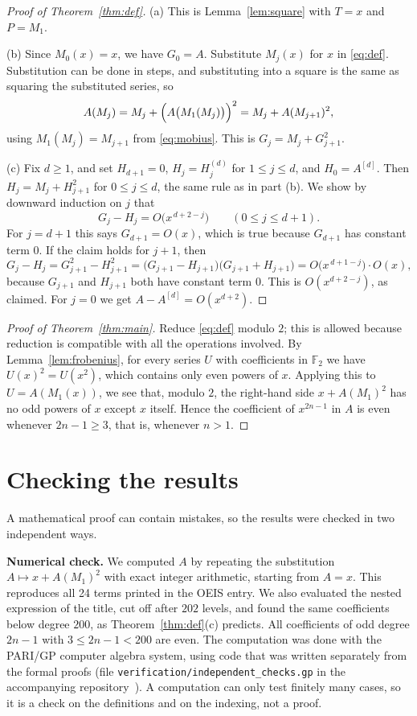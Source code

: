 \documentclass[11pt,a4paper]{article}
\theoremstyle{definition}
\theoremstyle{remark}
\newcommand{\F}{\mathbb{F}}
\newcommand{\para}[1]{\par\medskip\noindent\textbf{#1}\enspace}
\begin{document}
\begin{proof}[Proof of Theorem~\ref{thm:def}]
(a) This is Lemma~\ref{lem:square} with $T=x$ and $P=M_1$.

(b) Since $M_0(x)=x$, we have $G_0=A$. Substitute $M_j(x)$ for $x$ in \eqref{eq:def}. Substitution can be done in steps,
and substituting into a square is the same as squaring the substituted series, so
\[
A(M_j)=M_j+\Bigl(A\bigl(M_1(M_j)\bigr)\Bigr)^2=M_j+A(M_{j+1})^2,
\]
using $M_1(M_j)=M_{j+1}$ from \eqref{eq:mobius}. This is $G_j=M_j+G_{j+1}^2$.

(c) Fix $d\ge1$, and set $H_{d+1}=0$, $H_j=H^{(d)}_j$ for $1\le j\le d$, and $H_0=A^{[d]}$. Then
$H_j=M_j+H_{j+1}^2$ for $0\le j\le d$, the same rule as in part (b). We show by downward induction on $j$ that
\[
G_j-H_j=O\bigl(x^{\,d+2-j}\bigr)\qquad(0\le j\le d+1).
\]
For $j=d+1$ this says $G_{d+1}=O(x)$, which is true because $G_{d+1}$ has constant term $0$. If the claim holds for
$j+1$, then
\[
G_j-H_j=G_{j+1}^2-H_{j+1}^2=\bigl(G_{j+1}-H_{j+1}\bigr)\bigl(G_{j+1}+H_{j+1}\bigr)=O\bigl(x^{\,d+1-j}\bigr)\cdot O(x),
\]
because $G_{j+1}$ and $H_{j+1}$ both have constant term $0$. This is $O(x^{d+2-j})$, as claimed. For $j=0$ we get
$A-A^{[d]}=O(x^{d+2})$.
\end{proof}

\begin{proof}[Proof of Theorem~\ref{thm:main}]
Reduce \eqref{eq:def} modulo $2$; this is allowed because reduction is compatible with all the operations involved. By
Lemma~\ref{lem:frobenius}, for every series $U$ with coefficients in $\F_2$ we have $U(x)^2=U(x^2)$, which contains only
even powers of $x$. Applying this to $U=A(M_1(x))$, we see that, modulo $2$, the right-hand side $x+A(M_1)^2$ has no odd
powers of $x$ except $x$ itself. Hence the coefficient of $x^{2n-1}$ in $A$ is even whenever $2n-1\ge3$, that is,
whenever $n>1$.
\end{proof}

\section{Checking the results}\label{sec:checks}

A mathematical proof can contain mistakes, so the results were checked in two independent ways.

\para{Numerical check.}
We computed $A$ by repeating the substitution $A\mapsto x+A(M_1)^2$ with exact integer arithmetic, starting
from $A=x$. This reproduces all 24 terms printed in the OEIS entry. We also evaluated the nested expression of the title,
cut off after $202$ levels, and found the same coefficients below degree $200$, as Theorem~\ref{thm:def}(c) predicts.
All coefficients of odd degree $2n-1$ with $3\le2n-1<200$ are even.
The computation was done with the PARI/GP computer algebra system, using code that was written separately from the
formal proofs (file \texttt{verification/independent\_checks.gp} in the accompanying repository~\cite{repo}).
A computation can only test finitely many cases, so it is a check on the definitions and on the indexing, not a proof.
\end{document}
